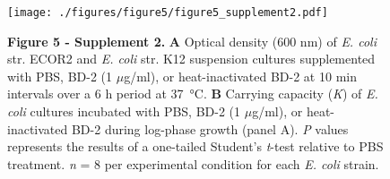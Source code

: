 \documentclass[9pt,lineo]{elife}
\date{\today}
\title{}
\begin{document}
\begin{figure}
\begin{fullwidth}
\centering\texttt{[image: ./figures/figure5/figure5\_supplement2.pdf]}
\caption*{\textbf{Figure 5 - Supplement 2. } \textbf{A} Optical density (600 nm) of \textit{E. coli} str. ECOR2 and \textit{E. coli} str. K12 suspension cultures supplemented with PBS, BD-2 (1 $\mu$g/ml), or heat-inactivated BD-2 at 10 min intervals over a 6 h period at \SI{37}{\celsius}. \textbf{B} Carrying capacity (\textit{K}) of \textit{E. coli} cultures incubated  with  PBS, BD-2 (1 $\mu$g/ml), or heat-inactivated BD-2 during log-phase growth (panel A). \textit{P} values represents the results of a one-tailed Student's \textit{t}-test relative to PBS treatment. \textit{n} = 8 per experimental condition for each \textit{E. coli} strain.}
\label{fig:fullwidth}
\end{fullwidth}
\end{figure}
\end{document}
